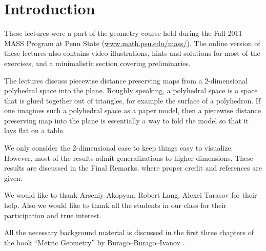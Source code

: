\tableofcontents

\section*{Introduction}


These lectures were a part of the geometry course held during the Fall 2011 MASS Program at Penn State (\url{www.math.psu.edu/mass/}).
The online version of these lectures \cite{petrunin-yashinsky-arXiv} also contains video illustrations,
hints and solutions for most of the exercises, and a minimalistic section covering preliminaries. 

The lectures discuss piecewise distance preserving maps from a 2-dimensional polyhedral space into the plane.  Roughly speaking, a polyhedral space is a space that is glued together out of triangles, for example the surface of a polyhedron.  If one imagines such a polyhedral space as a paper model, then a piecewise distance preserving map into the plane is essentially a way to fold the model so that it lays flat on a table. 

We only consider the 2-dimensional case to keep things easy to visualize.
However, 
most of the results admit generalizations to higher dimensions.
These results are discussed in the Final Remarks, where proper credit and references are given.

We would like to thank
Arseniy Akopyan, 
Robert Lang, 
Alexei Tarasov
for their help.
Also we would like to thank all the students in our class
for their participation and true interest.

All the necessary background material is discussed in the first three chapters of the book
``Metric Geometry'' by Burago--Burago--Ivanov \cite{BBI}.

